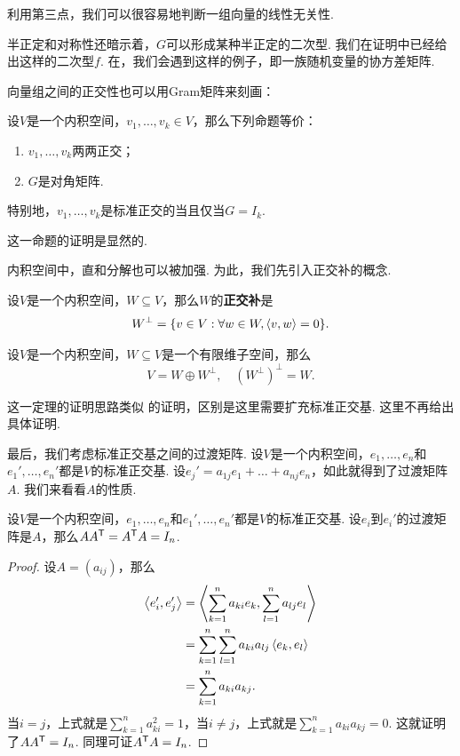 利用第三点，我们可以很容易地判断一组向量的线性无关性. 

半正定和对称性还暗示着，$G$可以形成某种半正定的二次型. 我们在证明中已经给出这样的二次型$f$. 在，我们会遇到这样的例子，即一族随机变量的协方差矩阵. 

向量组之间的正交性也可以用Gram矩阵来刻画：

\begin{proposition}\label{proposition:orthogonal-gram}
设$V$是一个内积空间，$v_1,\dots,v_k\in V$，那么下列命题等价：
\begin{enumerate}
    \item $v_1,\dots,v_k$两两正交；
    \item $G$是对角矩阵. 
\end{enumerate}
特别地，$v_1,\dots,v_k$是标准正交的当且仅当$G=I_k$.
\end{proposition}

这一命题的证明是显然的.

内积空间中，直和分解也可以被加强. 为此，我们先引入正交补的概念. 

\begin{definition}[正交补]\label{definition:orthogonal-complement}
设$V$是一个内积空间，$W\subseteq V$，那么$W$的\textbf{正交补}是
\[
    W^\bot=\{v\in V:\forall w\in W,\left\langle{v},{w}\right\rangle=0\}.
\]
\end{definition}

\begin{theorem}\label{proposition:orthogonal-complement}
设$V$是一个内积空间，$W\subseteq V$是一个有限维子空间，那么
\[
    V=W\oplus W^\bot,\quad (W^\bot)^\bot=W.
\]
\end{theorem}

这一定理的证明思路类似 的证明，区别是这里需要扩充标准正交基. 这里不再给出具体证明. 

最后，我们考虑标准正交基之间的过渡矩阵. 设$V$是一个内积空间，$e_1,\dots,e_n$和$e_1',\dots,e_n'$都是$V$的标准正交基. 设$e_j'=a_{1j}e_1+\dots+a_{nj}e_n$，如此就得到了过渡矩阵$A$. 我们来看看$A$的性质. 

\begin{proposition}
设$V$是一个内积空间，$e_1,\dots,e_n$和$e_1',\dots,e_n'$都是$V$的标准正交基. 设$e_i$到$e_i'$的过渡矩阵是$A$，那么$AA^{\mathsf{T}}=A^{\mathsf{T}} A=I_n$.
\end{proposition}
\begin{proof}
设$A=(a_{ij})$，那么
\begin{align*}
    \left\langle{e_i'},{e_j'}\right\rangle&=\left\langle{\sum_{k=1}^na_{ki}e_k},{\sum_{l=1}^na_{lj}e_l}\right\rangle \\
    &=\sum_{k=1}^n\sum_{l=1}^na_{ki}a_{lj}\left\langle{e_k},{e_l}\right\rangle \\
    &=\sum_{k=1}^na_{ki}a_{kj}.
\end{align*}
当$i=j$，上式就是$\sum_{k=1}^na_{ki}^2=1$，当$i\neq j$，上式就是$\sum_{k=1}^na_{ki}a_{kj}=0$. 这就证明了$AA^{\mathsf{T}}=I_n$. 同理可证$A^{\mathsf{T}} A=I_n$.
\end{proof}

